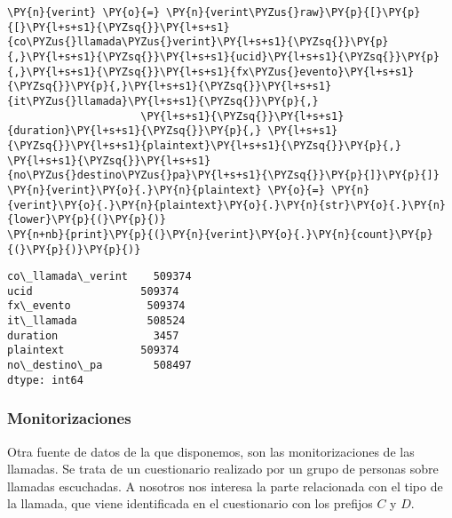     \begin{tcolorbox}[breakable, size=fbox, boxrule=1pt, pad at break*=1mm,colback=cellbackground, colframe=cellborder]
\begin{Verbatim}[commandchars=\\\{\}]
\PY{n}{verint} \PY{o}{=} \PY{n}{verint\PYZus{}raw}\PY{p}{[}\PY{p}{[}\PY{l+s+s1}{\PYZsq{}}\PY{l+s+s1}{co\PYZus{}llamada\PYZus{}verint}\PY{l+s+s1}{\PYZsq{}}\PY{p}{,}\PY{l+s+s1}{\PYZsq{}}\PY{l+s+s1}{ucid}\PY{l+s+s1}{\PYZsq{}}\PY{p}{,}\PY{l+s+s1}{\PYZsq{}}\PY{l+s+s1}{fx\PYZus{}evento}\PY{l+s+s1}{\PYZsq{}}\PY{p}{,}\PY{l+s+s1}{\PYZsq{}}\PY{l+s+s1}{it\PYZus{}llamada}\PY{l+s+s1}{\PYZsq{}}\PY{p}{,}
                     \PY{l+s+s1}{\PYZsq{}}\PY{l+s+s1}{duration}\PY{l+s+s1}{\PYZsq{}}\PY{p}{,} \PY{l+s+s1}{\PYZsq{}}\PY{l+s+s1}{plaintext}\PY{l+s+s1}{\PYZsq{}}\PY{p}{,} \PY{l+s+s1}{\PYZsq{}}\PY{l+s+s1}{no\PYZus{}destino\PYZus{}pa}\PY{l+s+s1}{\PYZsq{}}\PY{p}{]}\PY{p}{]}
\PY{n}{verint}\PY{o}{.}\PY{n}{plaintext} \PY{o}{=} \PY{n}{verint}\PY{o}{.}\PY{n}{plaintext}\PY{o}{.}\PY{n}{str}\PY{o}{.}\PY{n}{lower}\PY{p}{(}\PY{p}{)}
\PY{n+nb}{print}\PY{p}{(}\PY{n}{verint}\PY{o}{.}\PY{n}{count}\PY{p}{(}\PY{p}{)}\PY{p}{)}
\end{Verbatim}
\end{tcolorbox}

    \begin{Verbatim}[commandchars=\\\{\}]
co\_llamada\_verint    509374
ucid                 509374
fx\_evento            509374
it\_llamada           508524
duration               3457
plaintext            509374
no\_destino\_pa        508497
dtype: int64
    \end{Verbatim}


        
    \hypertarget{monitorizaciones}{%
\subsubsection{Monitorizaciones}\label{monitorizaciones}}

    Otra fuente de datos de la  que disponemos, son las monitorizaciones de las
llamadas. Se trata de un cuestionario realizado por un grupo de personas
sobre llamadas escuchadas. A nosotros nos interesa la parte relacionada
con el tipo de la llamada, que viene identificada en el cuestionario con los
prefijos $C$ y $D$.

\vspace{0.5cm}


